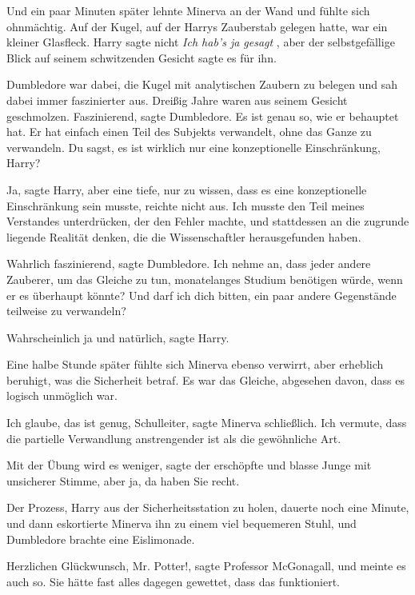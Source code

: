Und ein paar Minuten später lehnte Minerva an der Wand und fühlte sich
ohnmächtig. Auf der Kugel, auf der Harrys Zauberstab gelegen hatte, war ein
kleiner Glasfleck. Harry sagte nicht \emph{\glqq{}Ich hab's ja gesagt\grqq{}} ,
aber der selbstgefällige Blick auf seinem schwitzenden Gesicht sagte es für ihn.

Dumbledore war dabei, die Kugel mit analytischen Zaubern zu belegen und sah
dabei immer faszinierter aus. Dreißig Jahre waren aus seinem Gesicht
geschmolzen. \glqq{}Faszinierend\grqq{}, sagte Dumbledore. \glqq{}Es ist genau so,
wie er behauptet hat. Er hat einfach einen Teil des Subjekts verwandelt, ohne
das Ganze zu verwandeln. Du sagst, es ist wirklich nur eine konzeptionelle
Einschränkung, Harry?\grqq{}

\glqq{}Ja\grqq{}, sagte Harry, \glqq{}aber eine tiefe, nur zu wissen, dass es eine
konzeptionelle Einschränkung sein musste, reichte nicht aus. Ich musste den Teil
meines Verstandes unterdrücken, der den Fehler machte, und stattdessen an die
zugrunde liegende Realität denken, die die Wissenschaftler herausgefunden
haben.\grqq{}

\glqq{}Wahrlich faszinierend\grqq{}, sagte Dumbledore. \glqq{}Ich nehme an, dass
jeder andere Zauberer, um das Gleiche zu tun, monatelanges Studium benötigen
würde, wenn er es überhaupt könnte? Und darf ich dich bitten, ein paar andere
Gegenstände teilweise zu verwandeln?\grqq{}

\glqq{}Wahrscheinlich ja und natürlich\grqq{}, sagte Harry.

Eine halbe Stunde später fühlte sich Minerva ebenso verwirrt, aber erheblich
beruhigt, was die Sicherheit betraf. Es war das Gleiche, abgesehen davon, dass
es logisch unmöglich war.

\glqq{}Ich glaube, das ist genug, Schulleiter\grqq{}, sagte Minerva schließlich.
\glqq{}Ich vermute, dass die partielle Verwandlung anstrengender ist als die
gewöhnliche Art.\grqq{}

\glqq{}Mit der Übung wird es weniger\grqq{}, sagte der erschöpfte und blasse
Junge mit unsicherer Stimme, \glqq{}aber ja, da haben Sie recht.\grqq{}

Der Prozess, Harry aus der Sicherheitsstation zu holen, dauerte noch eine
Minute, und dann eskortierte Minerva ihn zu einem viel bequemeren Stuhl, und
Dumbledore brachte eine Eislimonade.

\glqq{}Herzlichen Glückwunsch, Mr. Potter!\grqq{}, sagte Professor McGonagall,
und meinte es auch so. Sie hätte fast alles dagegen gewettet, dass das
funktioniert.

